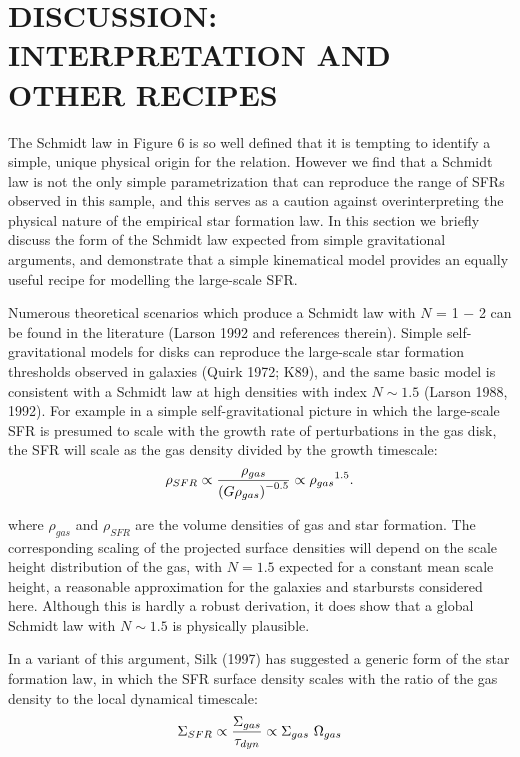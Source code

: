 \section{DISCUSSION: INTERPRETATION AND OTHER RECIPES}

The Schmidt law in Figure 6 is so well defined that it is 
tempting to identify a simple, unique physical origin for the relation.
However we find that a Schmidt law is not the only simple parametrization
that can reproduce the range of SFRs observed in this sample, and this
serves as a caution against overinterpreting the physical nature of 
the empirical star formation law.  In this section we briefly discuss
the form of the Schmidt law expected from simple gravitational arguments,
and demonstrate that a simple kinematical model 
provides an equally useful recipe for modelling the large-scale SFR.

Numerous theoretical scenarios which produce a Schmidt law 
with $N$ = 1 $-$ 2 can be found in the literature 
(Larson 1992 and references therein).  Simple self-gravitational
models for disks can reproduce the large-scale star formation thresholds
observed in galaxies (Quirk 1972; K89), and the same basic model is consistent
with a Schmidt law at high densities with index $N \sim 1.5$ 
(Larson 1988, 1992).  For example in a simple self-gravitational picture
in which the large-scale SFR is presumed to scale with the growth rate of 
perturbations in the gas disk, the SFR will scale as
the gas density divided by the growth timescale: 
\begin{equation}
{\rho_{SFR}} \propto { {\rho_{gas}} \over {{(G \rho_{gas})}^{-0.5}}} \propto
 {{\rho{_{gas}}^{1.5}}}  .
\end{equation}

\noindent
where $\rho_{gas}$ and $\rho_{SFR}$ are the volume densities of 
gas and star formation.  The corresponding scaling of the projected surface
densities will depend on the scale height distribution of the gas, with
$N = 1.5$ expected for a constant mean scale height, a 
reasonable approximation for the galaxies and starbursts considered here.
Although this is hardly a robust derivation, it does show that
a global Schmidt law with $N \sim 1.5$ is physically plausible.

In a variant of this argument, Silk (1997) has suggested a
generic form of the star formation law, in which the SFR surface 
density scales with the ratio of the gas density to the local dynamical
timescale:
\begin{equation}
\Sigma_{SFR} \propto { {\Sigma_{gas}} \over {\tau_{dyn}}} \propto 
   {\Sigma_{gas}~\Omega_{gas} }
\end{equation}

